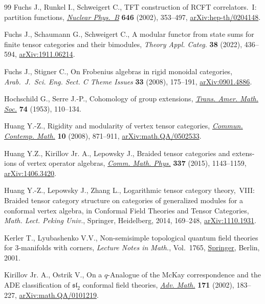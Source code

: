 \documentclass[pdftex]{sigma}
\numberwithin{equation}{section}
\begin{document}
\begin{thebibliography}{99}
Fuchs J., Runkel I., Schweigert C., {TFT} construction of {RCFT}
 correlators.~{I}: partition functions, \href{https://doi.org/10.1016/S0550-3213(02)00744-7}{\textit{Nuclear Phys.~B}} \textbf{646}
 (2002), 353--497, \href{https://arxiv.org/abs/hep-th/0204148}{arXiv:hep-th/0204148}.

Fuchs J., Schaumann G., Schweigert C., A modular functor from state sums for
 finite tensor categories and their bimodules, \textit{Theory Appl. Categ.}
 \textbf{38} (2022), 436--594, \href{https://arxiv.org/abs/1911.06214}{arXiv:1911.06214}.

Fuchs J., Stigner C., On {F}robenius algebras in rigid monoidal categories,
 \textit{Arab.~J.~Sci. Eng. Sect. C Theme Issues} \textbf{33} (2008),
 175--191, \href{https://arxiv.org/abs/0901.4886}{arXiv:0901.4886}.

Hochschild G., Serre J.-P., Cohomology of group extensions, \href{https://doi.org/10.2307/1990851}{\textit{Trans. Amer.
 Math. Soc.}} \textbf{74} (1953), 110--134.

Huang Y.-Z., Rigidity and modularity of vertex tensor categories,
 \href{https://doi.org/10.1142/S0219199708003083}{\textit{Commun. Contemp. Math.}} \textbf{10} (2008), 871--911,
 \href{https://arxiv.org/abs/math.QA/0502533}{arXiv:math.QA/0502533}.

Huang Y.Z., Kirillov Jr. A., Lepowsky J., Braided tensor categories and
 extens-ions of vertex operator algebras, \href{https://doi.org/10.1007/s00220-015-2292-1}{\textit{Comm. Math. Phys.}}
 \textbf{337} (2015), 1143--1159, \href{https://arxiv.org/abs/1406.3420}{arXiv:1406.3420}.

Huang Y.-Z., Lepowsky J., Zhang L., Logarithmic tensor category theory,~{VIII}:
 {B}raided tensor category structure on categories of generalized modules for
 a conformal vertex algebra, in Conformal {F}ield {T}heories and {T}ensor
 {C}ategories, \textit{Math. Lect. Peking Univ.}, Springer, Heidelberg, 2014, 169--248,
 \href{https://arxiv.org/abs/1110.1931}{arXiv:1110.1931}.

Kerler T., Lyubashenko V.V., Non-semisimple topological quantum field theories
 for 3-manifolds with corners, \textit{Lecture Notes in Math.}, Vol.~1765,
 \href{https://doi.org/10.1007/b82618}{Springer}, Berlin, 2001.

Kirillov Jr. A., Ostrik V., On a {$q$}-{A}nalogue of the {M}c{K}ay
 correspondence and the {ADE} classification of {$\mathfrak{sl}_2$} conformal
 field theories, \href{https://doi.org/10.1006/aima.2002.2072}{\textit{Adv. Math.}} \textbf{171} (2002), 183--227,
 \href{https://arxiv.org/abs/math.QA/0101219}{arXiv:math.QA/0101219}.


\end{thebibliography}
\end{document}
